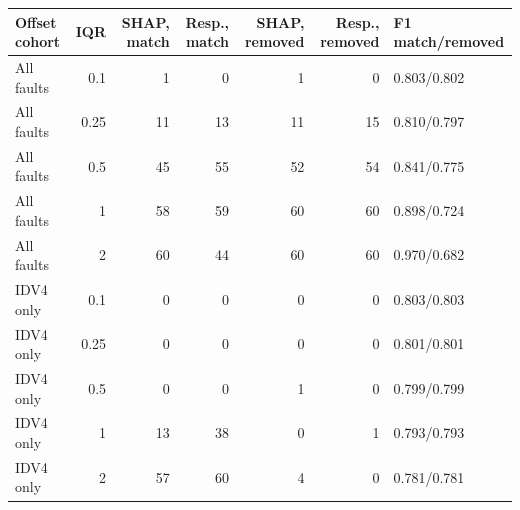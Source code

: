 \begin{tabular}{lrrrrrl}
\toprule
Offset cohort & IQR & SHAP, match & Resp., match & SHAP, removed & Resp., removed & F1 match/removed \\
\midrule
All faults & 0.1 & 1 & 0 & 1 & 0 & 0.803/0.802 \\
All faults & 0.25 & 11 & 13 & 11 & 15 & 0.810/0.797 \\
All faults & 0.5 & 45 & 55 & 52 & 54 & 0.841/0.775 \\
All faults & 1 & 58 & 59 & 60 & 60 & 0.898/0.724 \\
All faults & 2 & 60 & 44 & 60 & 60 & 0.970/0.682 \\
IDV4 only & 0.1 & 0 & 0 & 0 & 0 & 0.803/0.803 \\
IDV4 only & 0.25 & 0 & 0 & 0 & 0 & 0.801/0.801 \\
IDV4 only & 0.5 & 0 & 0 & 1 & 0 & 0.799/0.799 \\
IDV4 only & 1 & 13 & 38 & 0 & 1 & 0.793/0.793 \\
IDV4 only & 2 & 57 & 60 & 4 & 0 & 0.781/0.781 \\
\bottomrule
\end{tabular}
